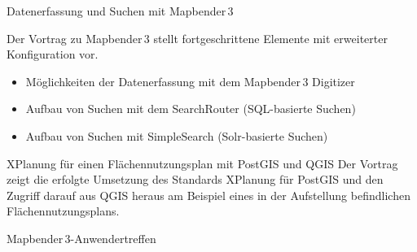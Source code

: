 %
{Datenerfassung und Suchen mit Mapbender\,3}%
{}%
{Der Vortrag zu Mapbender\,3 stellt fortgeschrittene Elemente mit erweiterter Konfiguration vor. 
\begin{itemize}
\RaggedRight
\setlength{\itemsep}{-2pt} %
 \item Möglichkeiten der Datenerfassung mit dem Mapbender\,3 Digitizer
 \item Aufbau von Suchen mit dem SearchRouter (SQL-basierte Suchen)
 \item Aufbau von Suchen mit SimpleSearch (Solr-basierte Suchen)
\end{itemize}
\justifying%
}

%
{XPlanung für einen Flächennutzungsplan mit PostGIS und QGIS}%
{}%
{Der Vortrag zeigt die erfolgte Umsetzung des Standards XPlanung für PostGIS und den Zugriff darauf aus
QGIS heraus am Beispiel eines in der Aufstellung befindlichen Flächennutzungsplans. }

\enlargethispage{6ex}\label{bof-dienstag}
%
{Mapbender\,3-Anwendertreffen}%
{}%
{}
